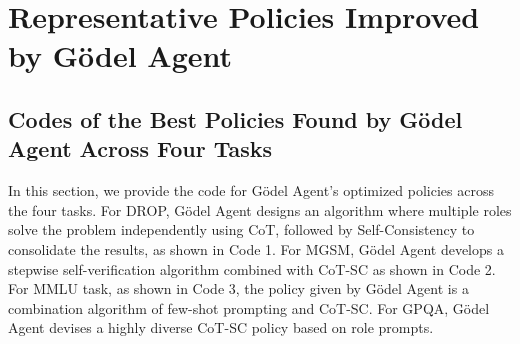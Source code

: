 \documentclass[11pt]{article}
\newcommand{\framework}{Gödel Agent\xspace}
\begin{document}


\section{Representative Policies Improved by \framework}

\subsection{Codes of the Best Policies Found by \framework Across Four Tasks}
\label{sec:maincode}
In this section, we provide the code for \framework's optimized policies across the four tasks. 
For DROP, \framework designs an algorithm where multiple roles solve the problem independently using CoT, followed by Self-Consistency to consolidate the results, as shown in Code 1.
For MGSM, \framework develops a stepwise self-verification algorithm combined with CoT-SC as shown in Code 2.
For MMLU task, as shown in Code 3, the policy given by \framework is a combination algorithm of few-shot prompting and CoT-SC.
For GPQA, \framework devises a highly diverse CoT-SC policy based on role prompts.
\end{document}
